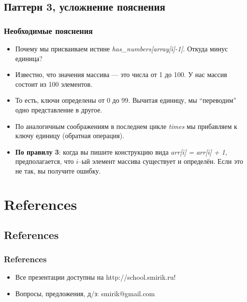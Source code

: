 \documentclass[compress,red]{beamer}
\begin{document}
\subsection{Паттерн 3, усложнение пояснения}
\begin{frame}[fragile]
\frametitle{Необходимые пояснения}
		\begin{itemize}
			\item Почему мы присваиваем истине \emph{has\_numbers[array[i]-1]}. Откуда минус единица?
			\item Известно, что значения массива --- это числа от 1 до 100. У нас массив состоит из 100 элементов.
			\item То есть, ключи определены от 0 до 99. Вычитая единицу, мы ``переводим'' одно представление в другое.
			\item По аналогичным соображениям в последнем цикле \emph{times} мы прибавляем к ключу единицу (обратная операция).
			\item \textbf{По правилу 3}: когда вы пишите конструкцию вида \emph{arr[i] = arr[i] + 1}, предполагается, что $i$--ый элемент массива существует и определён. Если это не так, вы получите ошибку.
		\end{itemize}
\end{frame}

\section{References}
\subsection{References}
\begin{frame}[fragile]
  \frametitle{References}
  \begin{itemize}
    \item Все презентации доступны на http://school.smirik.ru!
    \item Вопросы, предложения, д/з: smirik@gmail.com
  \end{itemize}
\end{frame}
\end{document}
